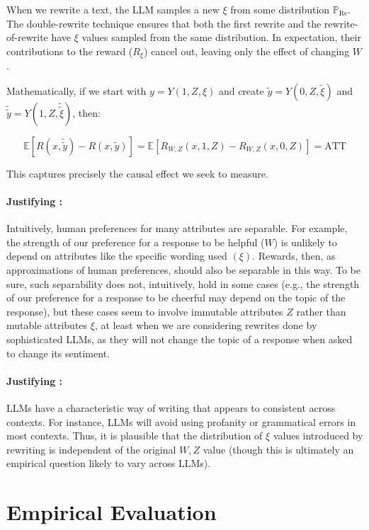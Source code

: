 When we rewrite a text, the LLM samples a new $\xi$ from some distribution $\mathbb{P}_{\text{Re}}$. The double-rewrite technique ensures that both the first rewrite and the rewrite-of-rewrite have $\xi$ values sampled from the same distribution. In expectation, their contributions to the reward ($R_{\xi}$) cancel out, leaving only the effect of changing $W$.

Mathematically, if we start with $y = Y(1,Z,\xi)$ and create $\tilde{y} = Y(0,Z,\tilde{\xi})$ and $\tilde{\tilde{y}} = Y(1,Z,\tilde{\tilde{\xi}})$, then:

$$\mathbb{E}[R(x,\tilde{\tilde{y}}) - R(x,\tilde{y})] = \mathbb{E}[R_{W,Z}(x,1,Z) - R_{W,Z}(x,0,Z)] = \text{ATT}$$

\noindent This captures precisely the causal effect we seek to measure.

\paragraph{Justifying :} Intuitively, human preferences for many attributes are separable. For example, the strength of our preference for a response to be helpful ($W$) is unlikely to depend on attributes like the specific wording used $(\xi)$. Rewards, then, as approximations of human preferences, should also be separable in this way. To be sure, such separability does not, intuitively, hold in some cases (e.g., the strength of our preference for a response to be cheerful may depend on the topic of the response), but these cases seem to involve immutable attributes $Z$ rather than mutable attributes $\xi$, at least when we are considering rewrites done by sophisticated LLMs, as they will not change the topic of a response when asked to change its sentiment.

\paragraph{Justifying :} LLMs have a characteristic way of writing that appears to consistent across contexts. For instance, LLMs will avoid using profanity or grammatical errors in most contexts. Thus, it is plausible that the distribution of $\xi$ values introduced by rewriting is independent of the original $W, Z$ value (though this is ultimately an empirical question likely to vary across LLMs).

\section{Empirical Evaluation}
\label{sec:experiments}

